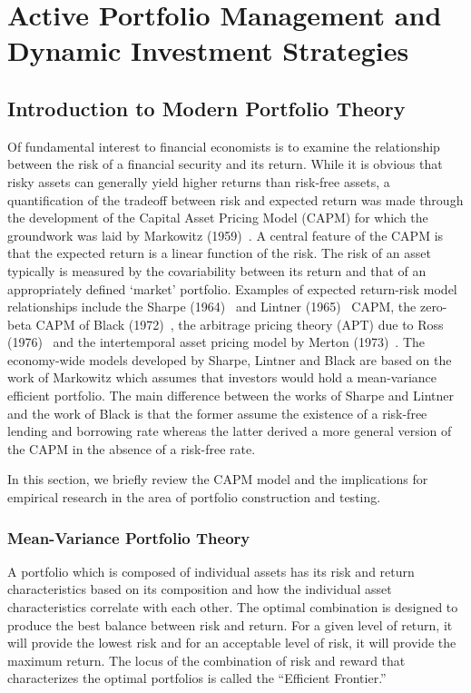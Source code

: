 
\chapter{Active Portfolio Management and Dynamic Investment Strategies}

\section{Introduction to Modern Portfolio Theory}


Of fundamental interest to financial economists is to examine the relationship between the risk of a financial security and its return. While it is obvious that risky assets can generally yield higher returns than risk-free assets, a quantification of the tradeoff between risk and expected return was made through the development of the Capital Asset Pricing Model (CAPM) for which the groundwork was laid by Markowitz (1959)~\cite{markport}. A central feature of the CAPM is that the expected return is a linear function of the risk. The risk of an asset typically is measured by the covariability between its return and that of an appropriately defined `market' portfolio. Examples of expected return-risk model relationships include the Sharpe (1964)~\cite{sharpcap} and Lintner (1965)~\cite{lint65} CAPM, the zero-beta CAPM of Black (1972)~\cite{blackcap}, the arbitrage pricing theory (APT) due to Ross (1976)~\cite{rossarb} and the intertemporal asset pricing model by Merton (1973)~\cite{mertonint}. The economy-wide models developed by Sharpe, Lintner and Black are based on the work of Markowitz which assumes that investors would hold a mean-variance efficient portfolio. The main difference between the works of Sharpe and Lintner and the work of Black is that the former assume the existence of a risk-free lending and borrowing rate whereas the latter derived a more general version of the CAPM in the absence of a risk-free rate.


In this section, we briefly review the CAPM model and the implications for empirical research in the area of portfolio construction and testing. 



\subsection{Mean-Variance Portfolio Theory}


A portfolio which is composed of individual assets has its risk and return characteristics based on its composition and how the individual asset characteristics correlate with each other. The optimal combination is designed to produce the best balance between risk and return. For a given level of return, it will provide the lowest risk and for an acceptable level of risk, it will provide the maximum return. The locus of the combination of risk and reward that characterizes the optimal portfolios is called the ``Efficient Frontier.''


